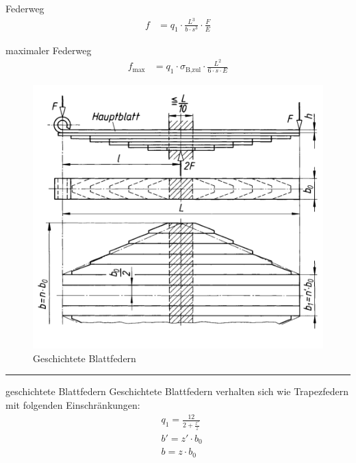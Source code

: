 \begin{eeqn}{Federweg}
	\begin{align}
		f &= q_1 \cdot \frac{L^3}{b\cdot s^3}\cdot \frac{F}{E}
	\end{align}
\end{eeqn}

\begin{eeqn}{maximaler Federweg}
	\begin{align}
		f_\text{max} &= q_1 \cdot \sigma_\text{B,zul} \cdot \frac{L^2}{6 \cdot s \cdot E}
	\end{align}
\end{eeqn}

\begin{figure}[H]
	\includegraphics[width=\linewidth]{federn/blattfedern-geschichtet}
	\caption*{Geschichtete Blattfedern}
\end{figure}

\hrule
\begin{eeqn}{geschichtete Blattfedern}
	Geschichtete Blattfedern verhalten sich wie Trapezfedern mit folgenden Einschränkungen:
	\begin{align}
		&q_1  = \frac{12}{2+\frac{z'}{z}}\\
		&b' = z'\cdot b_0 \\
		&b  = z \cdot b_0
	\end{align}
\end{eeqn}

